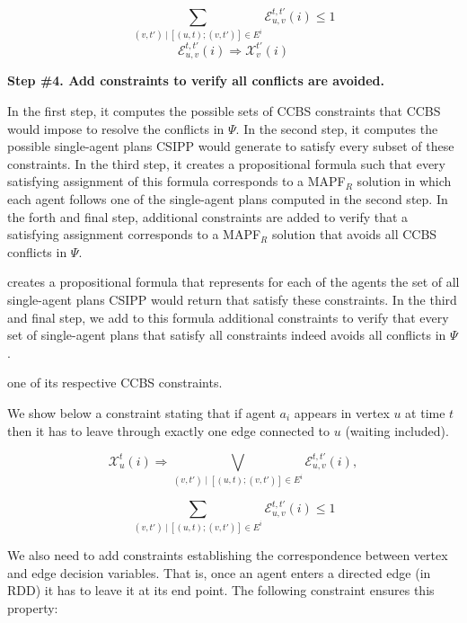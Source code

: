 \documentclass[review]{elsarticle}
\newcommand{\ccbs}{\ac{CCBS}\xspace}
\newcommand{\csipp}{\ac{CSIPP}\xspace}
\newcommand{\mapfr}{\ac{MAPF}$_R$\xspace}
\begin{document}
\begin{equation}[C2]
{  \sum_{(v,t')\:|\:[(u,t);(v,t')] \in E^i }{\mathcal{E}_{u,v}^{t,t'}{(i)} \leq 1}
}
\label{eq-2}
\end{equation}
\begin{equation}[C3]
{  \mathcal{E}_{u,v}^{t,t'}(i) \Rightarrow \mathcal{X}_v^{t'}(i)
}
\label{eq-3}
\end{equation}


\noindent \textbf{Step \#4. Add constraints to verify all conflicts are avoided.}

In the first step, it computes the possible sets of \ccbs constraints that \ccbs would impose to resolve the conflicts in $\Psi$. 
In the second step, it computes the possible single-agent plans \csipp would generate to satisfy every subset of these constraints. 
In the third step, it creates a propositional formula such that every satisfying assignment of this formula 
corresponds to a \mapfr solution in which each agent follows one of the single-agent plans computed in the second step. 
In the forth and final step, additional constraints are added to verify that a satisfying assignment corresponds to a \mapfr solution that avoids all \ccbs conflicts in $\Psi$. 

creates a propositional formula that represents for each of the agents the set of all single-agent plans \csipp would return that satisfy these constraints.
In the third and final step, we add to this formula additional constraints to verify that every set of single-agent plans that satisfy all constraints indeed avoids all conflicts in $\Psi$. 


one of its respective \ccbs constraints. 





We show below a constraint stating that if agent $a_i$ appears in vertex $u$ at time $t$ then it has to leave through exactly one edge connected to $u$ (waiting included).

\begin{equation}
{  \mathcal{X}_u^t(i) \Rightarrow \bigvee_{(v,t')\;|\;[(u,t);(v,t')] \in E^i}{\mathcal{E}^{t,t'}_{u,v}(i)},
}
\label{eq-1}
\end{equation}

\begin{equation}
{  \sum_{(v,t')\:|\:[(u,t);(v,t')] \in E^i }{\mathcal{E}_{u,v}^{t,t'}{(i)} \leq 1}
}
\label{eq-2}
\end{equation}

We also need to add constraints establishing the correspondence between vertex and edge decision variables. That is, once an agent enters a directed edge (in RDD) it has to leave it at its end point. The following constraint ensures this property:
\end{document}

